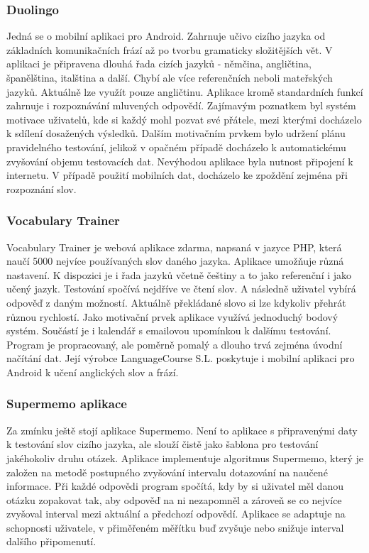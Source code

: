 \documentclass[a4paper,11pt,titlepage,fleqn]{article}
\begin{document}
        \subsubsection{Duolingo}
            Jedná se o mobilní aplikaci pro Android. Zahrnuje učivo cizího jazyka od základních komunikačních frází až po tvorbu gramaticky složitějších vět. V aplikaci je připravena dlouhá řada cizích jazyků - němčina, angličtina, španělština, italština a další. Chybí ale více referenčních neboli mateřských jazyků. Aktuálně lze využít pouze angličtinu. Aplikace kromě standardních funkcí zahrnuje i rozpoznávání mluvených odpovědí. Zajímavým poznatkem byl systém motivace uživatelů, kde si každý mohl pozvat své přátele, mezi kterými docházelo k sdílení dosažených výsledků. Dalším motivačním prvkem bylo udržení plánu pravidelného testování, jelikož v opačném případě docházelo k automatickému zvyšování objemu testovacích dat. Nevýhodou aplikace byla nutnost připojení k internetu. V případě použití mobilních dat, docházelo ke zpoždění zejména při rozpoznání slov.

        \subsubsection{Vocabulary Trainer}
            Vocabulary Trainer je webová aplikace zdarma, napsaná v jazyce PHP, která naučí 5000 nejvíce používaných slov daného jazyka. Aplikace umožňuje různá nastavení. K dispozici je i řada jazyků včetně češtiny a to jako referenční i jako učený jazyk. Testování spočívá nejdříve ve čtení slov. A následně uživatel vybírá odpověď z daným možností. Aktuálně překládané slovo si lze kdykoliv přehrát různou rychlostí. Jako motivační prvek aplikace využívá jednoduchý bodový systém. Součástí je i kalendář s emailovou upomínkou k dalšímu testování. Program je propracovaný, ale poměrně pomalý a dlouho trvá zejména úvodní načítání dat. Její výrobce LanguageCourse S.L. poskytuje i mobilní aplikaci pro Android k učení anglických slov a frází.

        \subsubsection{Supermemo aplikace}
            \label{supermemo-app}
            Za zmínku ještě stojí aplikace Supermemo. Není to aplikace s připravenými daty k testování slov cizího jazyka, ale slouží čistě jako šablona pro testování jakéhokoliv druhu otázek. Aplikace implementuje algoritmus Supermemo, který je založen na metodě postupného zvyšování intervalu dotazování na naučené informace. Při každé odpovědi program spočítá, kdy by si uživatel měl danou otázku zopakovat tak, aby odpověď na ni nezapomněl a zároveň se co nejvíce zvyšoval interval mezi aktuální a předchozí odpovědí. Aplikace se adaptuje na schopnosti uživatele, v přiměřeném měřítku buď zvyšuje nebo snižuje interval dalšího připomenutí.
\end{document}
